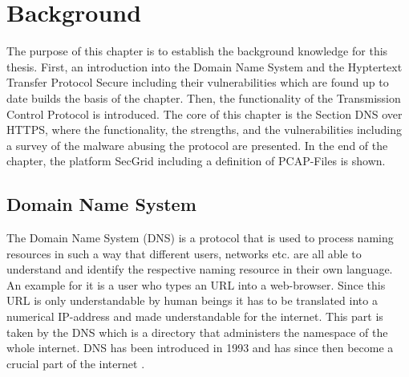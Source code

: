 \chapter{Background} \label{backgorund}
The purpose of this chapter is to establish the background knowledge for this thesis. First, an introduction into the Domain Name System and the Hyptertext Transfer Protocol Secure including their vulnerabilities which are found up to date builds the basis of the chapter. Then, the functionality of the Transmission Control Protocol is introduced. The core of this chapter is the Section DNS over HTTPS, where the functionality, the strengths, and the vulnerabilities including a survey of the malware abusing the protocol are presented. In the end of the chapter, the platform SecGrid including a definition of PCAP-Files is shown.

\section{Domain Name System} \label{DNS}
The Domain Name System (DNS) is a protocol that is used to process naming resources in such a way that different users, networks etc. are all able to understand and identify the respective naming resource in their own language. An example for it is a user who types an URL into a web-browser. Since this URL is only understandable by human beings it has to be translated into a numerical IP-address and made understandable for the internet. This part is taken by the DNS which is a directory that administers the namespace of the whole internet. DNS has been introduced in 1993 and has since then become a crucial part of the internet \cite{RFC1035}. 

